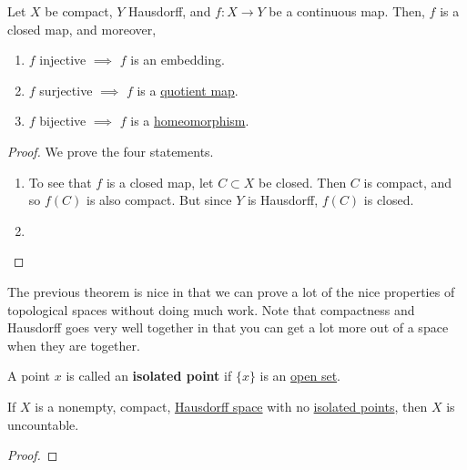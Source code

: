   \begin{theorem}
    \label{thm:continuous-mappings-from-compact-to-hausdorff}
    Let $X$ be compact, $Y$ Hausdorff, and $f: X \to Y$ be a continuous map. Then, $f$ is a closed map, and moreover, 
    \begin{enumerate}
      \item $f$ injective $\implies$ $f$ is an embedding. 
      \item $f$ surjective $\implies$ $f$ is a \hyperref[def:quotient-map]{quotient map}. 
      \item $f$ bijective $\implies$ $f$ is a \hyperref[def:homeomorphism]{homeomorphism}. 
    \end{enumerate}
  \end{theorem}
  \begin{proof} 
    We prove the four statements. 
    \begin{enumerate}
      \item To see that $f$ is a closed map, let $C \subset X$ be closed. Then $C$ is compact, and so $f(C)$ is also compact. But since $Y$ is Hausdorff, $f(C)$ is closed. 
      \item 
    \end{enumerate}
  \end{proof}

  The previous theorem is nice in that we can prove a lot of the nice properties of topological spaces without doing much work. Note that compactness and Hausdorff goes very well together in that you can get a lot more out of a space when they are together. 

  \begin{definition}
    \label{def:isolated-point}
    A point $x$ is called an \textbf{isolated point} if $\{x\}$ is an \hyperref[def:open-set]{open set}. 
  \end{definition}

  \begin{theorem}
    \label{thm:uncountability-of-compact-hausdorff-spaces}
    If $X$ is a nonempty, compact, \hyperref[def:hausdorff-space]{Hausdorff space} with no \hyperref[def:isolated-point]{isolated points}, then $X$ is uncountable. 
  \end{theorem}
  \begin{proof}
    
  \end{proof}

